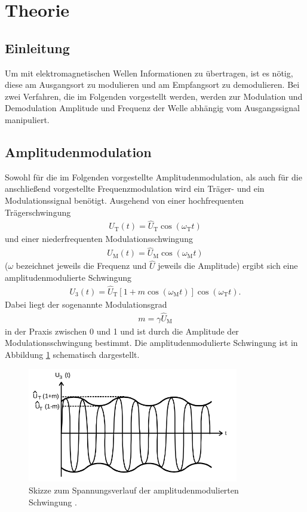 \section{Theorie}
\label{sec:Theorie}

\subsection{Einleitung}

Um mit elektromagnetischen Wellen Informationen zu übertragen, ist es nötig,
diese am Ausgangsort zu modulieren und am Empfangsort zu demodulieren. Bei zwei Verfahren,
die im Folgenden vorgestellt werden, werden zur Modulation und Demodulation Amplitude und Frequenz der
Welle abhängig vom Ausgangssignal manipuliert.

\subsection{Amplitudenmodulation}

Sowohl für die im Folgenden vorgestellte Amplitudenmodulation, als auch für die anschließend vorgestellte Frequenzmodulation
wird ein Träger- und ein Modulationssignal benötigt. Ausgehend von einer hochfrequenten Trägerschwingung
\begin{align}
  U_{\text{T}}(t) = \hat{U}_{\text{T}} \cos(\omega_{\text{T}} t)
  \label{eqn:traegersch}
\end{align}
und einer niederfrequenten Modulationsschwingung
\begin{align}
  U_{\text{M}}(t) = \hat{U}_{\text{M}} \cos(\omega_{\text{M}} t)
  \label{eqn:modulsch}
\end{align}
($\omega$ bezeichnet jeweils die Frequenz und $\hat{U}$ jeweils die Amplitude)
ergibt sich eine amplitudenmodulierte Schwingung
\begin{align}
  U_3 (t) = \hat{U}_{\text{T}} \left[ 1 + m \cos(\omega_{\text{M}} t) \right] \cos(\omega_{\text{T}} t).
  \label{eqn:amplmod1}
\end{align}
Dabei liegt der sogenannte Modulationsgrad
\begin{align}
  m = \gamma \hat{U}_\text{M}
\end{align}
in der Praxis zwischen 0 und 1 und ist durch die Amplitude der Modulationsschwingung bestimmt.
Die amplitudenmodulierte Schwingung ist in Abbildung \ref{fig:amplmodskizze}
schematisch dargestellt.

\begin{figure}
  \centering
  \includegraphics[height=5cm]{JasperErsterSchultag/amplmodskizze.png}
  \caption{Skizze zum Spannungsverlauf der amplitudenmodulierten Schwingung \cite{anleitung}.}
  \label{fig:amplmodskizze}
\end{figure}

